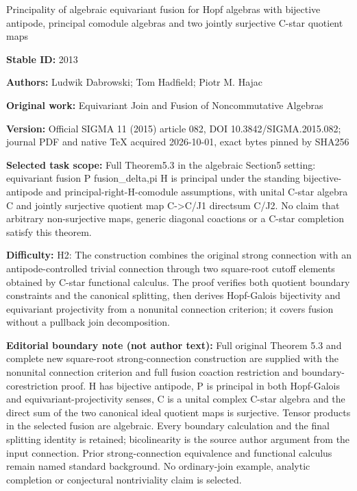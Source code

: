 \documentclass[11pt]{article}
\numberwithin{equation}{section}
\begin{document}
\begin{center}\Large Principality of algebraic equivariant fusion for Hopf algebras with bijective antipode, principal comodule algebras and two jointly surjective C-star quotient maps\end{center}
\noindent\textbf{Stable ID:} 2013\par
\noindent\textbf{Authors:} Ludwik Dabrowski; Tom Hadfield; Piotr M. Hajac\par
\noindent\textbf{Original work:} Equivariant Join and Fusion of Noncommutative Algebras\par
\noindent\textbf{Version:} Official SIGMA 11 (2015) article 082, DOI 10.3842/SIGMA.2015.082; journal PDF and native TeX acquired 2026-10-01, exact bytes pinned by SHA256\par
\noindent\textbf{Selected task scope:} Full Theorem5.3 in the algebraic Section5 setting: equivariant fusion P fusion\_delta,pi H is principal under the standing bijective-antipode and principal-right-H-comodule assumptions, with unital C-star algebra C and jointly surjective quotient map C->C/J1 directsum C/J2. No claim that arbitrary non-surjective maps, generic diagonal coactions or a C-star completion satisfy this theorem.\par
\noindent\textbf{Difficulty:} H2: The construction combines the original strong connection with an antipode-controlled trivial connection through two square-root cutoff elements obtained by C-star functional calculus. The proof verifies both quotient boundary constraints and the canonical splitting, then derives Hopf-Galois bijectivity and equivariant projectivity from a nonunital connection criterion; it covers fusion without a pullback join decomposition.\par
\noindent\textbf{Editorial boundary note (not author text):} Full original Theorem 5.3 and complete new square-root strong-connection construction are supplied with the nonunital connection criterion and full fusion coaction restriction and boundary-corestriction proof. H has bijective antipode, P is principal in both Hopf-Galois and equivariant-projectivity senses, C is a unital complex C-star algebra and the direct sum of the two canonical ideal quotient maps is surjective. Tensor products in the selected fusion are algebraic. Every boundary calculation and the final splitting identity is retained; bicolinearity is the source author argument from the input connection. Prior strong-connection equivalence and functional calculus remain named standard background. No ordinary-join example, analytic completion or conjectural nontriviality claim is selected.\par
\end{document}
